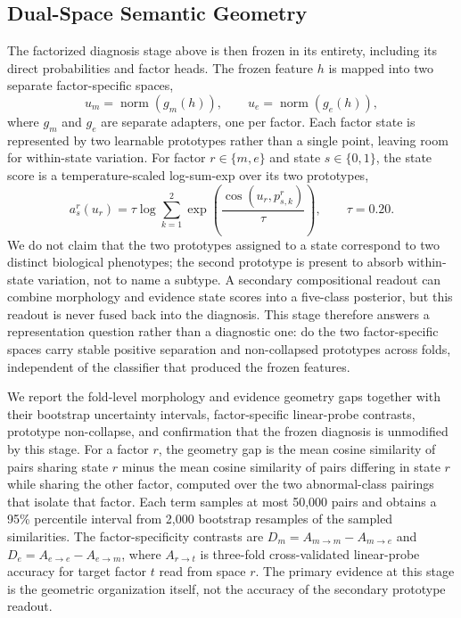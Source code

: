 \documentclass[conference]{IEEEtran}
\begin{document}
\subsection{Dual-Space Semantic Geometry}
\label{sec:semantic}
The factorized diagnosis stage above is then frozen in its entirety,
including its direct probabilities and factor heads. The frozen
feature $h$ is mapped into two separate factor-specific spaces,
\begin{equation}
    u_m=\operatorname{norm}(g_m(h)), \qquad
    u_e=\operatorname{norm}(g_e(h)),
    \label{eq:spaces}
\end{equation}
where $g_m$ and $g_e$ are separate adapters, one per factor. Each
factor state is represented by two learnable prototypes rather than a
single point, leaving room for within-state variation. For factor
$r\in\{m,e\}$ and state $s\in\{0,1\}$, the state score is a
temperature-scaled log-sum-exp over its two prototypes,
\begin{equation}
    a^r_s(u_r)=\tau\log\sum_{k=1}^{2}
    \exp\left(\frac{\operatorname{cos}(u_r,p^r_{s,k})}{\tau}\right),
    \qquad \tau=0.20.
    \label{eq:prototype}
\end{equation}
We do not claim that the two prototypes assigned to a state correspond
to two distinct biological phenotypes; the second prototype is present
to absorb within-state variation, not to name a subtype. A secondary
compositional readout can combine morphology and evidence state scores
into a five-class posterior, but this readout is never fused back into
the diagnosis. This stage therefore answers a representation question
rather than a diagnostic one: do the two factor-specific spaces carry
stable positive separation and non-collapsed prototypes across folds,
independent of the classifier that produced the frozen features.

We report the fold-level morphology and evidence geometry gaps
together with their bootstrap uncertainty intervals, factor-specific
linear-probe contrasts, prototype non-collapse, and confirmation that
the frozen diagnosis is unmodified by this stage. For a factor $r$,
the geometry gap is the mean cosine similarity of pairs sharing state
$r$ minus the mean cosine similarity of pairs differing in state $r$
while sharing the other factor, computed over the two abnormal-class
pairings that isolate that factor. Each term samples at most 50,000
pairs and obtains a 95\% percentile interval from 2,000 bootstrap
resamples of the sampled similarities. The factor-specificity
contrasts are $D_m=A_{m\to m}-A_{m\to e}$ and
$D_e=A_{e\to e}-A_{e\to m}$, where $A_{r\to t}$ is three-fold
cross-validated linear-probe accuracy for target factor $t$ read from
space $r$. The primary evidence at this stage is the geometric
organization itself, not the accuracy of the secondary prototype
readout.
\end{document}
